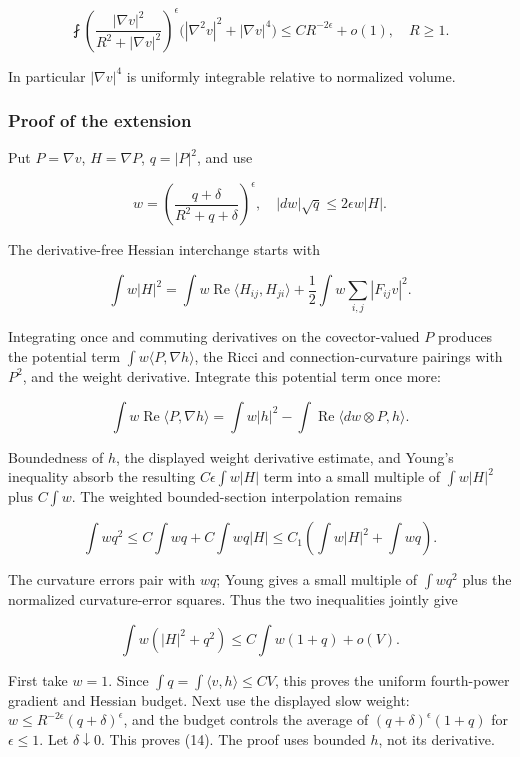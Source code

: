 \[
 \fint\left(\frac{|\nabla v|^2}{R^2+|\nabla v|^2}\right)^\epsilon
       \bigl(|\nabla^2v|^2+|\nabla v|^4\bigr)
 \le CR^{-2\epsilon}+o(1),\quad R\ge1.
\tag{14}
\]

In particular \(|\nabla v|^4\) is uniformly integrable relative to
normalized volume.

\hypertarget{o10strength:proof-of-the-extension}{%
\subsubsection{Proof of the extension}\label{o10strength:proof-of-the-extension}}

Put \(P=\nabla v\), \(H=\nabla P\), \(q=|P|^2\), and use

\[
 w=\left(\frac{q+\delta}{R^2+q+\delta}\right)^\epsilon,
 \quad |dw|\sqrt q\le2\epsilon w|H|.
\]

The derivative-free Hessian interchange starts with

\[
 \int w|H|^2
 =\int w\operatorname{Re}\langle H_{ij},H_{ji}\rangle
      +\frac12\int w\sum_{i,j}|F_{ij}v|^2.
\]

Integrating once and commuting derivatives on the covector-valued \(P\)
produces the potential term \(\int w\langle P,\nabla h\rangle\), the
Ricci and connection-curvature pairings with \(P^2\), and the weight
derivative. Integrate this potential term once more:

\[
 \int w\operatorname{Re}\langle P,\nabla h\rangle
 =\int w|h|^2-\int\operatorname{Re}\langle dw\otimes P,h\rangle.
\tag{15}
\]

Boundedness of \(h\), the displayed weight derivative estimate, and
Young's inequality absorb the resulting \(C\epsilon\int w|H|\) term into
a small multiple of \(\int w|H|^2\) plus \(C\int w\). The weighted
bounded-section interpolation remains

\[
 \int wq^2\le C\int wq+C\int wq|H|
 \le C_1\left(\int w|H|^2+\int wq\right).
\tag{16}
\]

The curvature errors pair with \(wq\); Young gives a small multiple of
\(\int wq^2\) plus the normalized curvature-error squares. Thus the two
inequalities jointly give

\[
 \int w(|H|^2+q^2)\le C\int w(1+q)+o(V).
\tag{17}
\]

First take \(w=1\). Since \(\int q=\int\langle v,h\rangle\le CV\), this
proves the uniform fourth-power gradient and Hessian budget. Next use
the displayed slow weight: \(w\le R^{-2\epsilon}(q+\delta)^\epsilon\),
and the budget controls the average of \((q+\delta)^\epsilon(1+q)\) for
\(\epsilon\le1\). Let \(\delta\downarrow0\). This proves (14). The proof
uses bounded \(h\), not its derivative.

